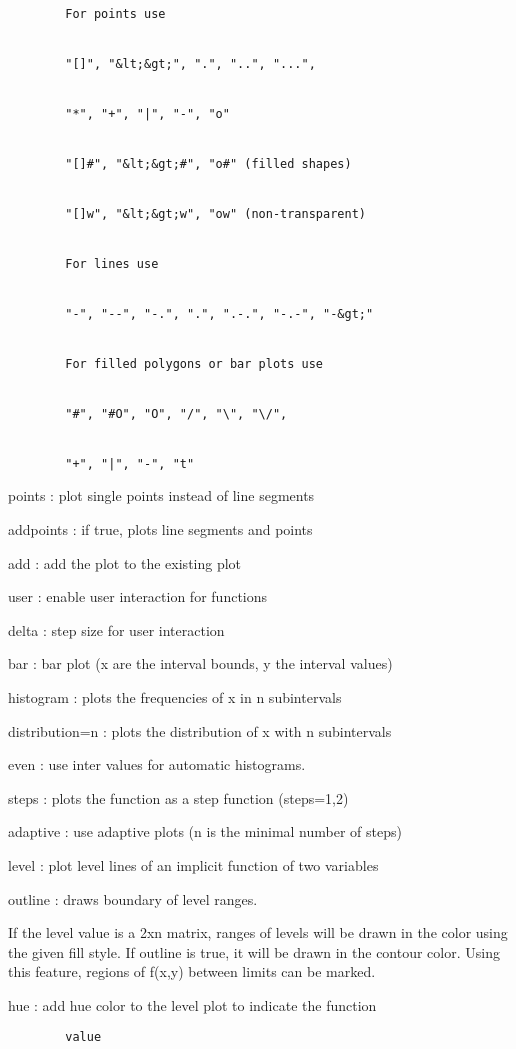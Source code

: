 \documentclass[
]{book}
\begin{document}
\begin{verbatim}
        For points use


        "[]", "&lt;&gt;", ".", "..", "...",


        "*", "+", "|", "-", "o"


        "[]#", "&lt;&gt;#", "o#" (filled shapes)


        "[]w", "&lt;&gt;w", "ow" (non-transparent)


        For lines use


        "-", "--", "-.", ".", ".-.", "-.-", "-&gt;"


        For filled polygons or bar plots use


        "#", "#O", "O", "/", "\", "\/",


        "+", "|", "-", "t"
\end{verbatim}

points : plot single points instead of line segments

addpoints : if true, plots line segments and points

add : add the plot to the existing plot

user : enable user interaction for functions

delta : step size for user interaction

bar : bar plot (x are the interval bounds, y the interval values)

histogram : plots the frequencies of x in n subintervals

distribution=n : plots the distribution of x with n subintervals

even : use inter values for automatic histograms.

steps : plots the function as a step function (steps=1,2)

adaptive : use adaptive plots (n is the minimal number of steps)

level : plot level lines of an implicit function of two variables

outline : draws boundary of level ranges.

If the level value is a 2xn matrix, ranges of levels will be drawn in the color using the given fill style. If outline is true, it will be drawn in the contour color. Using this feature, regions of f(x,y) between limits can be marked.

hue : add hue color to the level plot to indicate the function

\begin{verbatim}
        value
\end{verbatim}
\end{document}
